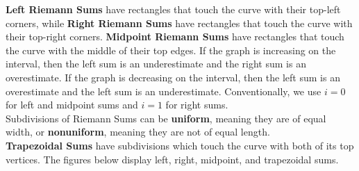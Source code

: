 \documentclass{article}
\begin{document}
            \noindent \textbf{Left Riemann Sums} have rectangles that touch the curve with their
            top-left corners, while \textbf{Right Riemann Sums} have rectangles that touch the curve
            with their top-right corners. \textbf{Midpoint Riemann Sums} have rectangles that touch
            the curve with the middle of their top edges. If the graph is increasing on the interval,
            then the left sum is an underestimate and the right sum is an overestimate. If the graph
            is decreasing on the interval, then the left sum is an overestimate and the left sum is
            an underestimate. Conventionally, we use $i=0$ for left and midpoint sums and $i=1$ for
            right sums. \\

            \noindent Subdivisions of Riemann Sums can be \textbf{uniform}, meaning they are of
            equal width, or \textbf{nonuniform}, meaning they are not of equal length. \\

            \noindent \textbf{Trapezoidal Sums} have subdivisions which touch the curve with both of
            its top vertices. The figures below display left, right, midpoint, and trapezoidal sums.
\end{document}
